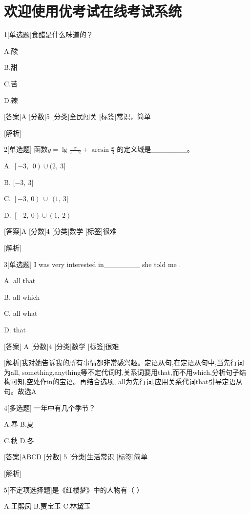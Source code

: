 \hypertarget{ux6b22ux8fceux4f7fux7528ux4f18ux8003ux8bd5ux5728ux7ebfux8003ux8bd5ux7cfbux7edf}{%
\section{欢迎使用优考试在线考试系统}\label{ux6b22ux8fceux4f7fux7528ux4f18ux8003ux8bd5ux5728ux7ebfux8003ux8bd5ux7cfbux7edf}}

1{[}单选题{]}食醋是什么味道的？

A.酸

B.甜

C.苦

D.辣

{[}答案{]}A {[}分数{]}5 {[}分类{]}全民闯关 {[}标签{]}常识，简单

{[}解析{]}

2{[}单选题{]} 函数\(y = \lg\frac{x}{x - 2} + \arcsin\frac{x}{3}\)
的定义域是\_\_\_\_\_\_\_。

A. \(\left\lbrack - 3,\ \ 0 \right) \cup (2,\ 3\rbrack\)

B. \(\lbrack - 3,\ 3\rbrack\)

C. \(\left\lbrack - 3,\ 0 \right)\  \cup \ \ (1,\ 3\rbrack\)

D. \(\left\lbrack - 2,\ 0 \right) \cup (1,\ 2)\)

{[}答案{]}A {[}分数{]}4 {[}分类{]}数学 {[}标签{]}很难

{[}解析{]}

3{[}单选题{]} I was very interested in\_\_\_\_\_\_\_ she told me .

A. all that

B. all which

C. all what

D. that

{[}答案{]} A {[}分数{]}4 {[}分类{]}数学 {[}标签{]}很难

{[}解析{]}我对她告诉我的所有事情都非常感兴趣。定语从句,在定语从句中,当先行词为all,
something,anything等不定代词时,关系词要用that,而不用which,分析句子结构可知,空处作in的宝语。再结合选项,
all为先行词,应用关系代词that引导定语从句。故选A

4{[}多选题{]} 一年中有几个季节？

A.春 B.夏

C.秋 D.冬

{[}答案{]}ABCD {[}分数{]} 5 {[}分类{]}生活常识 {[}标签{]}简单

{[}解析{]}

5{[}不定项选择题{]}是《红楼梦》中的人物有（ ）

A.王熙凤 B.贾宝玉 C.林黛玉


